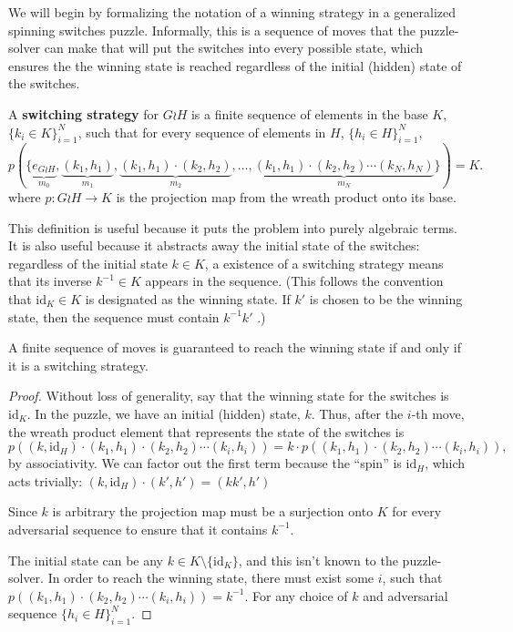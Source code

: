 We will begin by formalizing the notation of a winning strategy in a
generalized spinning switches puzzle. Informally, this is
a sequence of moves that the puzzle-solver can make that will put the switches
into every possible state, which ensures the the winning state is reached
regardless of the initial (hidden) state of the switches.

\begin{definition}
  A \textbf{switching strategy} for $G \wr H$ is a finite sequence of elements
  in the base $K$,
  $\{k_i \in K\}_{i=1}^N$,
  such that for every sequence of elements in $H$, ${\{h_i \in H\}_{i=1}^N}$,
  \begin{equation}
    p(\{
      \underbrace{e_{G \wr H}}_{m_0},
      \underbrace{(k_1, h_1)}_{m_1},
      \underbrace{(k_1, h_1)\cdot(k_2, h_2)}_{m_2},
      \dots,
      \underbrace{(k_1, h_1)\cdot(k_2, h_2)\cdots(k_N, h_N)}_{m_N}
    \}) = K.
  \end{equation}
  where $p \colon G \wr H \rightarrow K$ is the projection map from the
  wreath product onto its base.
\label{def:switchingStrategy}
\end{definition}

This definition is useful because it puts the problem into purely algebraic
terms. It is also useful because it abstracts away the initial state of the
switches: regardless of the initial state $k \in K$, a existence of a switching strategy
means that its inverse $k^{-1} \in K$ appears in the sequence.
(This follows the convention that $\mathrm{id}_K \in K$ is designated as the
winning state. If $k'$ is chosen to be the winning state, then the sequence
must contain $k^{-1}k'$ .)

\begin{proposition}
  A finite sequence of moves is guaranteed to reach the winning
  state if and only if it is a switching strategy.
\end{proposition}
\begin{proof}
  Without loss of generality, say that the winning state for the switches is
  $\mathrm{id}_K$.
  In the puzzle, we have an initial (hidden) state, $k$.
  Thus, after the $i$-th move, the wreath product
  element that represents the state of the switches is \begin{equation}
    p\left((k, \mathrm{id}_H)\cdot(k_1, h_1)\cdot(k_2, h_2)\cdots(k_i, h_i)\right)
    = k \cdot p\left((k_1, h_1)\cdot(k_2, h_2)\cdots(k_i, h_i)\right),
  \end{equation} by associativity. We can factor out the first term because
  the ``spin'' is $\mathrm{id}_H$, which acts trivially:
  ${(k, \mathrm{id}_H) \cdot (k', h') = (kk', h')}$

  Since $k$ is arbitrary the projection map must be a surjection onto $K$ for
  every adversarial sequence to ensure that it contains $k^{-1}$.

  The initial state can be any $k \in K \setminus \{\mathrm{id}_K\}$,
  and this isn't known to the puzzle-solver.
  In order to reach the winning state, there must exist some $i$, such that
  $p\left((k_1, h_1)\cdot(k_2, h_2)\cdots(k_i, h_i)\right) = k^{-1}$.
  For any choice of $k$ and adversarial sequence $\{h_i \in H\}_{i=1}^N$.
\end{proof}

